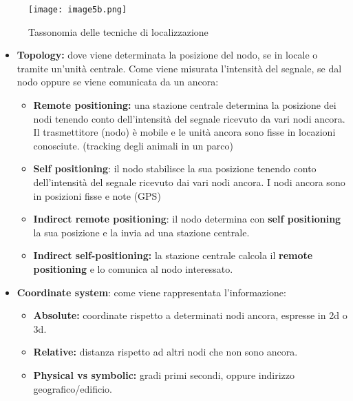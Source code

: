 \begin{figure}[H]
 \centering
 \texttt{[image: image5b.png]}
 \caption{Tassonomia delle tecniche di localizzazione}
 \label{tassonomia-delle-tecniche-di-localizzazione}
\end{figure}

\begin{itemize}
\item \textbf{Topology:} dove viene determinata la posizione del nodo, se in
  locale o tramite un'unità centrale. Come viene misurata l'intensità
  del segnale, se dal nodo oppure se viene comunicata da un ancora:

  \begin{itemize}
  \item \textbf{Remote positioning:} una stazione centrale determina la
    posizione dei nodi tenendo conto dell'intensità del segnale ricevuto
    da vari nodi ancora. Il trasmettitore (nodo) è mobile e le unità
    ancora sono fisse in locazioni conosciute. (tracking degli animali
    in un parco)

  \item \textbf{Self positioning}: il nodo stabilisce la sua posizione
    tenendo conto dell'intensità del segnale ricevuto dai vari nodi
    ancora. I nodi ancora sono in posizioni fisse e note (GPS)

  \item \textbf{Indirect remote positioning}: il nodo determina con
    \textbf{self positioning} la sua posizione e la invia ad una
    stazione centrale.

  \item \textbf{Indirect self-positioning:} la stazione centrale calcola il
    \textbf{remote positioning} e lo comunica al nodo interessato.

  \end{itemize}
\item \textbf{Coordinate system}: come viene rappresentata l'informazione:

  \begin{itemize}
  \item \textbf{Absolute:} coordinate rispetto a determinati nodi ancora,
    espresse in 2d o 3d.

  \item \textbf{Relative:} distanza rispetto ad altri nodi che non sono
    ancora.

  \item \textbf{Physical vs symbolic:} gradi primi secondi, oppure indirizzo
    geografico/edificio.


\end{itemize}
\end{itemize}
